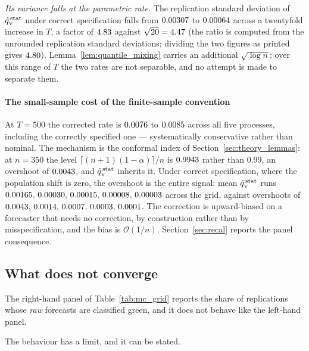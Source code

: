 \emph{Its variance falls at the parametric rate.} The replication standard
deviation of $\hat{q}_{\scriptscriptstyle\mathrm{V}}^{\,\mathrm{stat}}$ under correct specification falls from $0.00307$ to $0.00064$ across a twentyfold increase in $T$, a factor of $4.83$ against $\sqrt{20} = 4.47$ (the ratio is computed from the unrounded replication standard deviations; dividing the two figures as printed gives $4.80$). Lemma~\ref{lem:quantile_mixing} carries an additional
$\sqrt{\log n}$; over this range of $T$ the two rates are not separable, and no
attempt is made to separate them.

\paragraph{The small-sample cost of the finite-sample convention} At $T = 500$
the corrected rate is $0.0076$ to $0.0085$ across all five processes, including
the correctly specified one --- systematically conservative rather than nominal.
The mechanism is the conformal index of Section~\ref{sec:theory_lemmas}: at
$n = 350$ the level $\lceil (n+1)(1-\alpha)\rceil/n$ is $0.9943$ rather than
$0.99$, an overshoot of $0.0043$, and $\hat{q}_{\scriptscriptstyle\mathrm{V}}^{\,\mathrm{stat}}$ inherits it. Under correct
specification, where the population shift is zero, the overshoot is the entire
signal: mean $\hat{q}_{\scriptscriptstyle\mathrm{V}}^{\,\mathrm{stat}}$ runs $0.00165,\,0.00030,\,0.00015,\,0.00008,\,0.00003$
across the grid, against overshoots of $0.0043,\,0.0014,\,0.0007,\,0.0003,\,0.0001$.
The correction is upward-biased on a forecaster that needs no correction, by
construction rather than by misspecification, and the bias is $\mathcal O(1/n)$.
Section~\ref{sec:recal} reports the panel consequence.

\subsection{What does not converge}
\label{sec:mc_diverges}

The right-hand panel of Table~\ref{tab:mc_grid} reports the share of replications
whose \emph{raw} forecasts are classified green, and it does not behave like the
left-hand panel.

The behaviour has a limit, and it can be stated.


